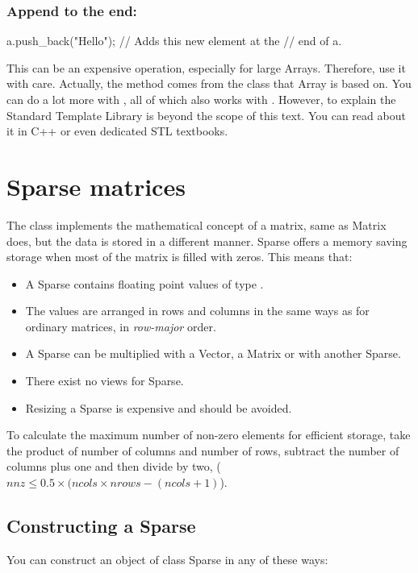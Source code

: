 \subsubsection{Append to the end:}
\begin{code}
a.push_back("Hello"); // Adds this new element at the
                      // end of a.
\end{code}

This can be an expensive operation, especially for large Arrays.
Therefore, use it with care. Actually, the  method
comes from the  class that Array is based on. You
can do a lot more with , all of which also works
with . However, to explain the Standard Template Library
is beyond the scope of this text. You can read about it in C++ or even
dedicated STL textbooks.

\section{Sparse matrices}
\label{sec:matpack:sparse}

The class  implements the mathematical concept of a
matrix, same as Matrix does, but the data is stored in a
different manner. Sparse offers a memory saving storage when
most of the matrix is filled with zeros. This means that:
\begin{itemize}
\item A Sparse contains floating point values of type .
\item The values are arranged in rows and columns in the same ways as for
  ordinary matrices, in \emph{row-major} order.
\item A Sparse can be multiplied with a Vector, a Matrix or with another
  Sparse.
\item There exist no views for Sparse.
\item Resizing a Sparse is expensive and should be avoided.
\end{itemize}

To calculate the maximum number of non-zero elements for efficient storage,
take the product of number of columns and number of rows, subtract the
number of columns plus one and then divide by two,
\mbox{($nnz \leq 0.5\times (ncols\times nrows - (ncols+1)$).}

\subsection{Constructing a Sparse}
You can construct an object of class Sparse in any of these ways:

